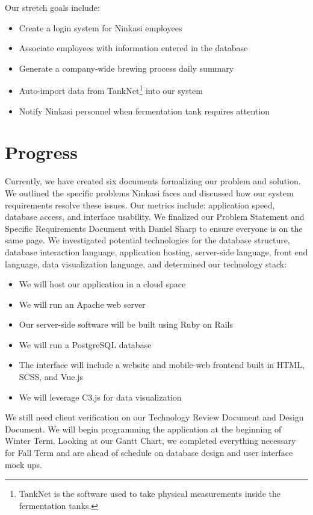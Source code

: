 \documentclass[draftclsnofoot,onecolumn,letterpaper,10pt,compsoc]{IEEEtran}
\begin{document}
Our stretch goals include:
\begin{itemize}
  \item Create a login system for Ninkasi employees
	\item Associate employees with information entered in the database
  \item Generate a company-wide brewing process daily summary
  \item Auto-import data from TankNet\footnote{TankNet is the software used to take physical measurements inside the fermentation tanks.} into our system
  \item Notify Ninkasi personnel when fermentation tank requires attention
\end{itemize}
\section{Progress}

Currently, we have created six documents formalizing our problem and solution.
We outlined the specific problems Ninkasi faces and discussed how our system requirements resolve these issues.
Our metrics include: application speed, database access, and interface usability.
We finalized our Problem Statement and Specific Requirements Document with Daniel Sharp to ensure everyone is on the same page.
We investigated potential technologies for the database structure, database interaction language, application hosting, server-side language, front end language, data visualization language, and determined our technology stack:
\begin{itemize}
	\item We will host our application in a cloud space
	\item We will run an Apache web server
	\item Our server-side software will be built using Ruby on Rails
	\item We will run a PostgreSQL database
	\item The interface will include a website and mobile-web frontend built in HTML, SCSS, and Vue.js
	\item We will leverage C3.js for data visualization
\end{itemize}

We still need client verification on our Technology Review Document and Design Document.
We will begin programming the application at the beginning of Winter Term.
Looking at our Gantt Chart, we completed everything necessary for Fall Term and are ahead of schedule on database design and user interface mock ups.
\end{document}
